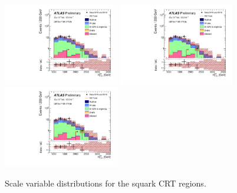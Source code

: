 \begin{figure}[tbph]
\begin{center}
\includegraphics[width=0.45\textwidth]{figures/ATLAS-CONF-2016-078_INT/N-1Plots/AtlasStyle/Preliminary/CRT_SRJigsawSRS2b_LastCut_CRT_minusone}
\includegraphics[width=0.45\textwidth]{figures/ATLAS-CONF-2016-078_INT/N-1Plots/AtlasStyle/Preliminary/CRT_SRJigsawSRS3a_LastCut_CRT_minusone}
\includegraphics[width=0.45\textwidth]{figures/ATLAS-CONF-2016-078_INT/N-1Plots/AtlasStyle/Preliminary/CRT_SRJigsawSRS3b_LastCut_CRT_minusone}
\end{center}
\caption{Scale variable distributions for the squark CRT regions.}
\label{fig:CRT_SRJigsawSRS1a_LastCut_CRT_minusone}
\end{figure}

\clearpage

